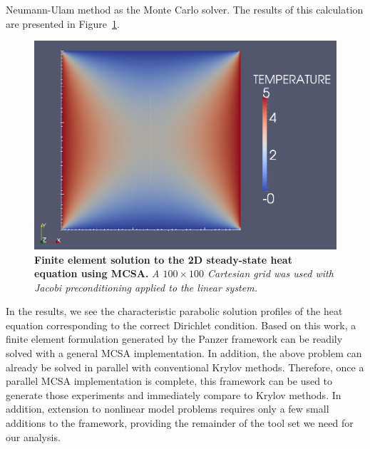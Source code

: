 Neumann-Ulam method as the Monte Carlo solver. The results of this
calculation are presented in Figure~\ref{fig:heat_eq_solution}.
\begin{figure}[htpb!]
  \centering
  \includegraphics[width=5in,clip]{chapters/research_proposal/heat_eq_solution.png}
  \caption{\textbf{Finite element solution to the 2D steady-state heat
      equation using MCSA.} \textit{A $100 \times 100$ Cartesian grid
      was used with Jacobi preconditioning applied to the linear
      system.}}
  \label{fig:heat_eq_solution}
\end{figure}
In the results, we see the characteristic parabolic solution profiles
of the heat equation corresponding to the correct Dirichlet
condition. Based on this work, a finite element formulation generated
by the Panzer framework can be readily solved with a general MCSA
implementation. In addition, the above problem can already be solved
in parallel with conventional Krylov methods. Therefore, once a
parallel MCSA implementation is complete, this framework can be used
to generate those experiments and immediately compare to Krylov
methods. In addition, extension to nonlinear model problems requires
only a few small additions to the framework, providing the remainder
of the tool set we need for our analysis.

